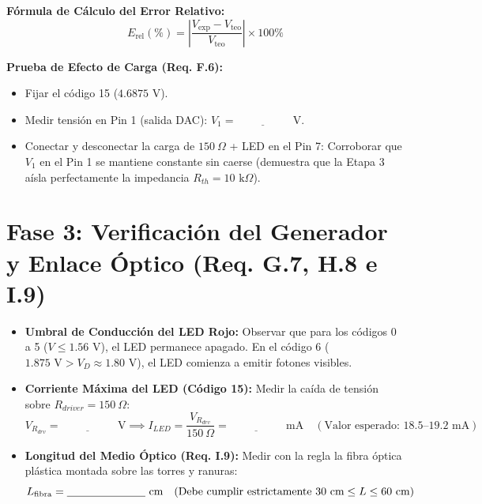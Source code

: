 \documentclass[10pt,a4paper]{article}
\newcommand{\squarebox}{\raisebox{-0.1ex}{\Large $\square$}}
\begin{document}
\noindent\textbf{Fórmula de Cálculo del Error Relativo:}
\begin{equation*}
    E_{\text{rel}}(\%) = \left| \frac{V_{\text{exp}} - V_{\text{teo}}}{V_{\text{teo}}} \right| \times 100\%
\end{equation*}

\noindent\textbf{Prueba de Efecto de Carga (Req. F.6):}
\begin{itemize}[label=\squarebox]
    \item Fijar el código 15 ($4.6875\text{ V}$).
    \item Medir tensión en Pin 1 (salida DAC): $V_1 = \underline{\hspace{2cm}}\text{ V}$.
    \item Conectar y desconectar la carga de $150\ \Omega$ + LED en el Pin 7: Corroborar que $V_1$ en el Pin 1 se mantiene constante sin caerse (demuestra que la Etapa 3 aísla perfectamente la impedancia $R_{th} = 10\text{ k}\Omega$).
\end{itemize}

\section{Fase 3: Verificación del Generador y Enlace Óptico (Req. G.7, H.8 e I.9)}

\begin{itemize}[label=\squarebox]
    \item \textbf{Umbral de Conducción del LED Rojo:} Observar que para los códigos 0 a 5 ($V \le 1.56\text{ V}$), el LED permanece apagado. En el código 6 ($1.875\text{ V} > V_D \approx 1.80\text{ V}$), el LED comienza a emitir fotones visibles.
    \item \textbf{Corriente Máxima del LED (Código 15):} Medir la caída de tensión sobre $R_{driver} = 150\ \Omega$:
    \begin{equation*}
        V_{R_{drv}} = \underline{\hspace{2cm}}\text{ V} \implies I_{LED} = \frac{V_{R_{drv}}}{150\ \Omega} = \underline{\hspace{2cm}}\text{ mA} \quad (\text{Valor esperado: } 18.5\text{--}19.2\text{ mA})
    \end{equation*}
    \item \textbf{Longitud del Medio Óptico (Req. I.9):} Medir con la regla la fibra óptica plástica montada sobre las torres y ranuras:
    \begin{equation*}
        L_{\text{fibra}} = \underline{\hspace{2.5cm}}\text{ cm} \quad (\text{Debe cumplir estrictamente } 30\text{ cm} \le L \le 60\text{ cm})
    \end{equation*}
\end{itemize}
\end{document}
